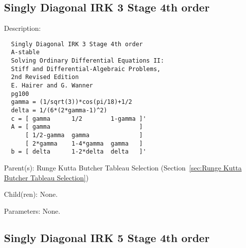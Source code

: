 \subsection{Singly Diagonal IRK 3 Stage 4th order}
\label{sec:Singly Diagonal IRK 3 Stage 4th order}

\begin{list}{}
  {\setlength{\leftmargin}{1.0in}
   \setlength{\labelwidth}{0.75in}
   \setlength{\labelsep}{0.125in}}
  \item[Description:]
\begin{verbatim}
  Singly Diagonal IRK 3 Stage 4th order
  A-stable
  Solving Ordinary Differential Equations II:
  Stiff and Differential-Algebraic Problems,
  2nd Revised Edition
  E. Hairer and G. Wanner
  pg100
  gamma = (1/sqrt(3))*cos(pi/18)+1/2
  delta = 1/(6*(2*gamma-1)^2)
  c = [ gamma      1/2        1-gamma ]'
  A = [ gamma                         ]
      [ 1/2-gamma  gamma              ]
      [ 2*gamma    1-4*gamma  gamma   ]
  b = [ delta      1-2*delta  delta   ]'
\end{verbatim}
  \item[Parent(s):]
    Runge Kutta Butcher Tableau Selection (Section~\ref{sec:Runge Kutta Butcher Tableau Selection})
  \item[Child(ren):]
    None. 
  \item[Parameters:]
    None. 
\end{list}

\subsection{Singly Diagonal IRK 5 Stage 4th order}
\label{sec:Singly Diagonal IRK 5 Stage 4th order}

